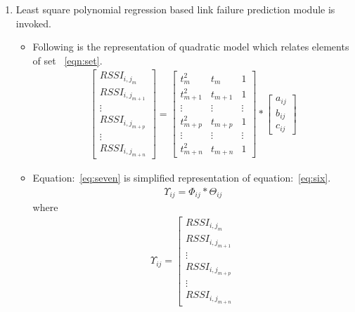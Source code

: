 \documentclass[runningheads]{llncs}
\begin{document}
\begin{enumerate}
		\item Least square polynomial regression based link failure prediction module is invoked.
		\begin{itemize} 
			\item Following is the representation of quadratic model which relates elements of set ~\ref{eqn:set}.
			\begin{equation}%
			\begin{aligned}
			\left[\begin{matrix}RSSI_{i,j_{m}} \\RSSI_{i,j_{m+1}}\\ \vdots\\RSSI_{i,j_{m+p}}\\ \vdots\\RSSI_{i,j_{m+n}}
			\end{matrix} \right] = \left[\begin{matrix} t^{2}_{m} & t_{m} & 1\\t^{2}_{m+1} & t_{m+1} & 1\\   \vdots & \vdots & \vdots\\t^{2}_{m+p} & t_{m+p} & 1 \\  \vdots & \vdots & \vdots  \\t^{2}_{m+n} & t_{m+n} & 1 \end{matrix} \right] 
			*\left[\begin{matrix}  a_{ij} \\ b_{ij} \\ c_{ij}\end{matrix} \right]             
			\end{aligned}\label{eq:six}
			\end{equation}
			\item Equation:~\ref{eq:seven} is simplified representation of equation:~\ref{eq:six}. 
			\begin{equation}%
			\begin{aligned}
			\varUpsilon_{ij}     = \varPhi_{ij} *\varTheta _{ij}
			\end{aligned}\label{eq:seven}
			\end{equation}     
			where 
			\begin{equation}%
			\begin{aligned}
			\varUpsilon_{ij} =\left[\begin{matrix}RSSI_{i,j_{m}} \\RSSI_{i,j_{m+1}}\\ \vdots\\RSSI_{i,j_{m+p}}\\ \vdots\\RSSI_{i,j_{m+n}}

\end{matrix}
\end{aligned}
\end{equation}
\end{itemize}
\end{enumerate}
\end{document}
